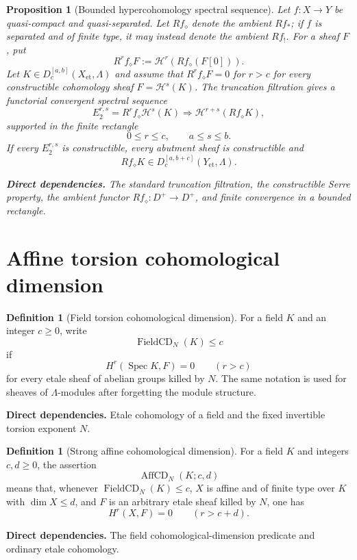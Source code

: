 \documentclass[10pt]{article}
\newtheorem{proposition}[theorem]{Proposition}
\theoremstyle{definition}
\newtheorem{definition}[theorem]{Definition}
\newcommand{\Spec}{\operatorname{Spec}}
\newcommand{\deps}[1]{\par\smallskip\noindent\textbf{Direct dependencies.} #1}
\begin{document}
\begin{proposition}[Bounded hypercohomology spectral sequence]
\label{prop:hypercohomology}
Let $f:X\to Y$ be quasi-compact and quasi-separated.  Let $Rf_\diamond$
denote the ambient $Rf_*$; if $f$ is separated and of finite type, it may
instead denote the ambient $Rf_!$.  For a sheaf $F$, put
\[
 R^rf_\diamond F:=\mathcal H^r(Rf_\diamond(F[0])).
\]
Let $K\in D_c^{[a,b]}(X_{\mathrm{et}},\Lambda)$ and assume that
$R^rf_\diamond F=0$ for $r>c$ for every constructible cohomology sheaf
$F=\mathcal H^s(K)$.  The truncation filtration gives a functorial
convergent spectral sequence
\[
 E_2^{r,s}=R^rf_\diamond\mathcal H^s(K)
 \Longrightarrow \mathcal H^{r+s}(Rf_\diamond K),
\]
supported in the finite rectangle
\[
 0\leq r\leq c,\qquad a\leq s\leq b.
\]
If every $E_2^{r,s}$ is constructible, every abutment sheaf is
constructible and
\[
 Rf_\diamond K\in D_c^{[a,b+c]}(Y_{\mathrm{et}},\Lambda).
\]
\deps{The standard truncation filtration, the constructible Serre property,
the ambient functor $Rf_\diamond:D^+\to D^+$, and finite convergence in a
bounded rectangle.}
\end{proposition}

\section{Affine torsion cohomological dimension}

\begin{definition}[Field torsion cohomological dimension]
\label{def:field-cd}
For a field $K$ and an integer $c\geq0$, write
\[
 \operatorname{FieldCD}_N(K)\leq c
\]
if
\[
 H^r(\Spec K,F)=0\qquad(r>c)
\]
for every etale sheaf of abelian groups killed by $N$.  The same notation is
used for sheaves of $\Lambda$-modules after forgetting the module structure.
\deps{Etale cohomology of a field and the fixed invertible torsion exponent
$N$.}
\end{definition}

\begin{definition}[Strong affine cohomological dimension]
\label{def:strong-affine-cd}
For a field $K$ and integers $c,d\geq0$, the assertion
\[
 \operatorname{AffCD}_N(K;c,d)
\]
means that, whenever $\operatorname{FieldCD}_N(K)\leq c$, $X$ is affine and
of finite type over $K$ with $\dim X\leq d$, and $F$ is an arbitrary etale
sheaf killed by $N$, one has
\[
 H^r(X,F)=0\qquad(r>c+d).
\]
\deps{The field cohomological-dimension predicate and ordinary etale
cohomology.}
\end{definition}
\end{document}
